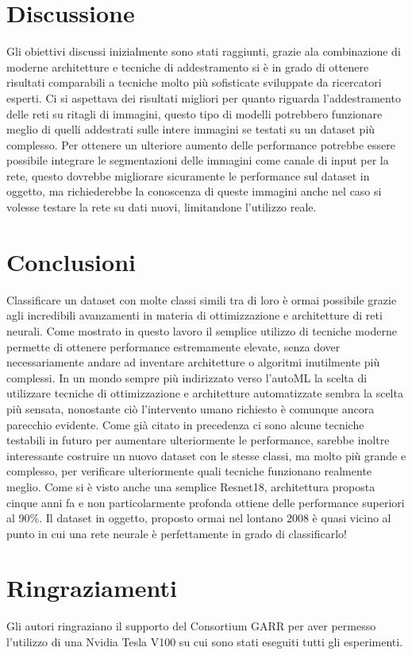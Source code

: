 \section{Discussione}
Gli obiettivi discussi inizialmente sono stati raggiunti, grazie ala combinazione di moderne architetture e tecniche di addestramento si è in grado di ottenere risultati comparabili a tecniche molto più sofisticate sviluppate da ricercatori esperti. Ci si aspettava dei risultati migliori per quanto riguarda l'addestramento delle reti su ritagli di immagini, questo tipo di modelli potrebbero funzionare meglio di quelli addestrati sulle intere immagini se testati su un dataset più complesso. Per ottenere un ulteriore aumento delle performance potrebbe essere possibile integrare le segmentazioni delle immagini come canale di input per la rete, questo dovrebbe migliorare sicuramente le performance sul dataset in oggetto, ma richiederebbe la conoscenza di queste immagini anche nel caso si volesse testare la rete su dati nuovi, limitandone l'utilizzo reale.

\section{Conclusioni}
Classificare un dataset con molte classi simili tra di loro è ormai possibile grazie agli incredibili avanzamenti in materia di ottimizzazione e architetture di reti neurali. Come mostrato in questo lavoro il semplice utilizzo di tecniche moderne permette di ottenere performance estremamente elevate, senza dover necessariamente andare ad inventare architetture o algoritmi inutilmente più complessi. In un mondo sempre più indirizzato verso l'autoML la scelta di utilizzare tecniche di ottimizzazione e architetture automatizzate sembra la scelta più sensata, nonostante ciò l'intervento umano richiesto è comunque ancora parecchio evidente. Come già citato in precedenza ci sono alcune tecniche testabili in futuro per aumentare ulteriormente le performance, sarebbe inoltre interessante costruire un nuovo dataset con le stesse classi, ma molto più grande e complesso, per verificare ulteriormente quali tecniche funzionano realmente meglio. Come si è visto anche una semplice Resnet18, architettura proposta cinque anni fa e non particolarmente profonda ottiene delle performance superiori al 90\%. Il dataset in oggetto, proposto ormai nel lontano 2008 è quasi vicino al punto in cui una rete neurale è perfettamente in grado di classificarlo!

\section*{Ringraziamenti}
Gli autori ringraziano il supporto del Consortium GARR per aver permesso l'utilizzo di una Nvidia Tesla V100 su cui sono stati eseguiti tutti gli esperimenti.



